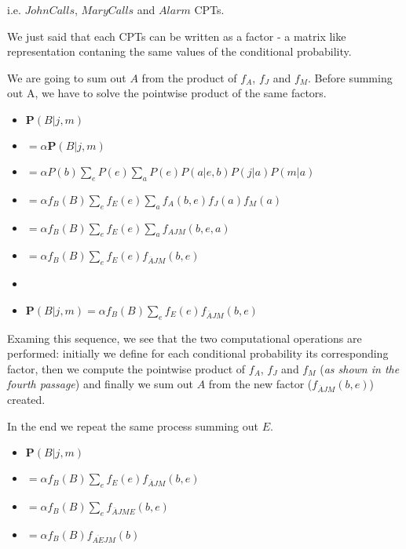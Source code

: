 \begin{example}
    i.e. $JohnCalls$, $MaryCalls$ and $Alarm$ CPTs.
    \begin{center}
    \end{center}

    We just said that each CPTs can be written as a factor - a matrix like representation contaning the same values of the conditional probability. \vspace{3.5pt}

    We are going to sum out $A$ from the product of $f_A$, $f_J$ and $f_M$. Before summing out A, we have to solve the pointwise product of the same factors. \vspace{3.5pt}

    \begin{itemize}
        \renewcommand{\labelitemi}{}
        \item $\mathbf{P}(B|j,m)$
        \item $= \alpha \mathbf{P}(B|j, m)$
        \item $= \alpha P(b)\sum_{e}P(e)\sum_{a}P(e)P(a|e, b)P(j|a)P(m|a)$
        \item $= \alpha f_B(B) \sum_{e} f_E(e) \sum_{a} f_A(b, e) f_J(a) f_M(a)$
        \item $= \alpha f_B(B) \sum_{e} f_E(e) \sum_{a} f_{AJM}(b, e, a)$
        \item $= \alpha f_B(B) \sum_{e} f_E(e) f_{\overline{A}JM}(b, e)$
        \item 
        \item $\mathbf{P}(B|j,m) = \alpha f_B(B) \sum_{e} f_E(e) f_{\overline{A}JM}(b, e)$
    \end{itemize} \vspace{7pt}
    Examing this sequence, we see that the two computational operations are performed: initially we define for each conditional probability its corresponding factor,
    then we compute the pointwise product of $f_A$, $f_J$ and $f_M$ (\textit{as shown in the fourth passage}) and finally we sum out $A$ from the new factor ($f_{\overline{A}JM}(b, e)$)
    created. \vspace{7pt}

    In the end we repeat the same process summing out $E$.
    \begin{itemize}
        \renewcommand{\labelitemi}{}
        \item $\mathbf{P}(B|j,m)$
        \item $= \alpha f_B(B) \sum_{e} f_E(e) f_{\overline{A}JM}(b, e)$
        \item $= \alpha f_B(B) \sum_{e} f_{\overline{A}JME}(b, e)$
        \item $= \alpha f_B(B) f_{\overline{AE}JM}(b)$
    \end{itemize}
\end{example}
